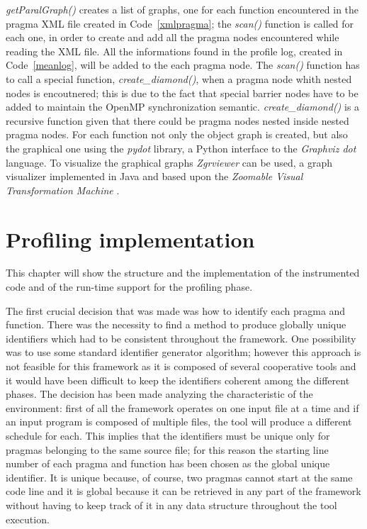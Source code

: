 \documentclass[a4paper,12pt,oneside]{book}
\begin{document}
\emph{getParalGraph()} creates a list of graphs, one for each function encountered in the pragma XML file created in Code~\ref{xmlpragma}; the \emph{scan()} function is called for each one, in order to create and add all the pragma nodes encountered while reading the XML file. All the informations found in the profile log, created in Code~\ref{meanlog}, will be added to the each pragma node. The \emph{scan()} function has to call a special function, \emph{create\_diamond()}, when a pragma node whith nested nodes is encoutnered; this is due to the fact that special barrier nodes have to be added to maintain the OpenMP synchronization semantic. \emph{create\_diamond()} is a recursive function given that there could be pragma nodes nested inside nested pragma nodes. For each function not only the object graph is created, but also the graphical one using the \emph{pydot} library, a Python interface to the \emph{Graphviz dot} language. To visualize the graphical graphs \emph{Zgrviewer} can be used, a graph visualizer implemented in Java and based upon the \emph{Zoomable Visual Transformation Machine} \cite{zvtm}.


\section{Profiling implementation}
This chapter will show the structure and the implementation of the instrumented code and of the run-time support for the profiling phase.

The first crucial decision that was made was how to identify each pragma and function. There was the necessity to find a method to produce globally unique identifiers which had to be consistent throughout the framework. One possibility was to use some standard identifier generator algorithm; however this approach is not feasible for this framework as it is composed of several cooperative tools and it would have been difficult to keep the identifiers coherent among the different phases. The decision has been made analyzing the characteristic of the environment: first of all the framework operates on one input file at a time and if an input program is composed of multiple files, the tool will produce a different schedule for each. This implies that the identifiers must be unique only for pragmas belonging to the same source file; for this reason the starting line number of each pragma and function has been chosen as the global unique identifier. It is unique because, of course, two pragmas cannot start at the same code line and it is global because it can be retrieved in any part of the framework without having to keep track of it in any data structure throughout the tool execution.
\end{document}
